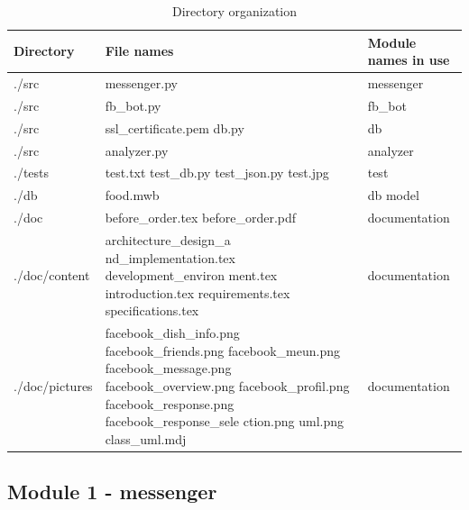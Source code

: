 \begin{table}[htbp]
\caption{Directory organization}
\begin{tabularx}{\linewidth}{|X|X|X|}
\toprule
Directory & File names & Module names in use  \\
\midrule
./src & messenger.py & messenger  \newline\\
./src & fb\_bot.py &  fb\_bot\newline \\
./src & ssl\_certificate.pem db.py \newline  & db \\
./src & analyzer.py & analyzer \newline \\
./tests & 
test.txt \newline 
test\_db.py \newline
test\_json.py	 \newline
test.jpg  \newline
& test\\
./db & food.mwb \newline & db model  \\
./doc & before\_order.tex before\_order.pdf \newline & documentation  \\
./doc/content & architecture\_design\_a nd\_implementation.tex development\_environ ment.tex introduction.tex requirements.tex specifications.tex \newline & documentation \\
./doc/pictures & 
facebook\_dish\_info.png \newline
facebook\_friends.png \newline
facebook\_meun.png \newline
facebook\_message.png \newline
facebook\_overview.png \newline
facebook\_profil.png \newline
facebook\_response.png \newline
facebook\_response\_sele ction.png	\newline
uml.png \newline
class\_uml.mdj 
& documentation \\
\end{tabularx}
\end{table}
\FloatBarrier

\subsection{Module 1 - messenger} 

